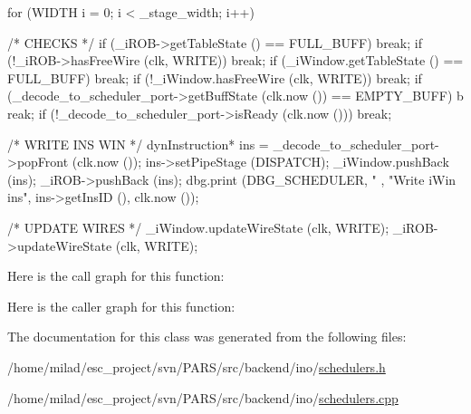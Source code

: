 \begin{DoxyCode}
                                           {
    for (WIDTH i = 0; i < _stage_width; i++) {
        /* CHECKS */
        if (_iROB->getTableState () == FULL_BUFF) break;
        if (!_iROB->hasFreeWire (clk, WRITE)) break;
        if (_iWindow.getTableState () == FULL_BUFF) break;
        if (!_iWindow.hasFreeWire (clk, WRITE)) break;
        if (_decode_to_scheduler_port->getBuffState (clk.now ()) == EMPTY_BUFF) b
      reak;
        if (!_decode_to_scheduler_port->isReady (clk.now ())) break;

        /* WRITE INS WIN */
        dynInstruction* ins = _decode_to_scheduler_port->popFront (clk.now ());
        ins->setPipeStage (DISPATCH);
        _iWindow.pushBack (ins);
        _iROB->pushBack (ins);
        dbg.print (DBG_SCHEDULER, "%
      , "Write iWin ins", ins->getInsID (), clk.now ());

        /* UPDATE WIRES */
        _iWindow.updateWireState (clk, WRITE);
        _iROB->updateWireState (clk, WRITE);
    }
}
\end{DoxyCode}


Here is the call graph for this function:




Here is the caller graph for this function:




The documentation for this class was generated from the following files:\begin{DoxyCompactItemize}
\item 
/home/milad/esc\_\-project/svn/PARS/src/backend/ino/\hyperlink{ino_2schedulers_8h}{schedulers.h}\item 
/home/milad/esc\_\-project/svn/PARS/src/backend/ino/\hyperlink{ino_2schedulers_8cpp}{schedulers.cpp}\end{DoxyCompactItemize}
